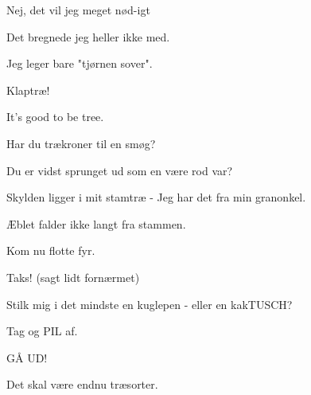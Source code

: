 \documentclass[a4paper,11pt]{article}
\begin{document}
\begin{sketch}
 Nej, det vil jeg meget nød-igt

 Det bregnede jeg heller ikke med.

 Jeg leger bare "tjørnen sover".


 Klaptræ!


 It's good to be tree.

 Har du trækroner til en smøg?

 Du er vidst sprunget ud som en være rod var?

 Skylden ligger i mit stamtræ - Jeg har det fra min granonkel.

 Æblet falder ikke langt fra stammen.

 Kom nu flotte fyr.

 Taks! (sagt lidt fornærmet)

 Stilk mig i det mindste en kuglepen - eller en kakTUSCH?

 Tag og PIL af.


 GÅ UD!


 Det skal være endnu træsorter.

\end{sketch}
\end{document}
